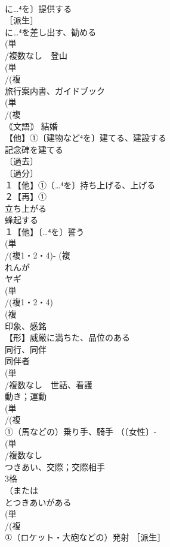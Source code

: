 \documentclass[8pt]{extreport}
\begin{document}
\begin{CJK}{UTF8}{min}
\\	に…⁴を〕提供する 
\\	［派生］ 
\\	に…⁴を差し出す、勧める
\\	(単
\\	/複数なし　登山 
\\	(単
\\	/(複
\\	旅行案内書、ガイドブック 
\\	(単
\\	/(複
\\	｟文語｠ 結婚 
\\	【他】①〔建物など⁴を〕建てる、建設する 
\\	記念碑を建てる
\\	〔過去〕
\\	〔過分〕
\\	１【他】①〔…⁴を〕持ち上げる、上げる 
\\	２【再】①
\\	立ち上がる 
\\	蜂起する
\\	１【他】〔…⁴を〕誓う 
\\	(単
\\	/(複1・2・4)- (複
\\	れんが 
\\	ヤギ 
\\	(単
\\	/(複1・2・4)
\\	(複
\\	印象、感銘 
\\	【形】威厳に満ちた、品位のある 
\\	同行、同伴　
\\	同伴者
\\	(単
\\	/複数なし　世話、看護 
\\	動き；運動 
\\	(単
\\	/(複
\\	①（馬などの）乗り手、騎手 （〔女性〕-
\\	(単
\\	/複数なし 
\\	つきあい、交際；交際相手 
\\	3格 
\\	（または
\\	とつきあいがある
\\	(単
\\	/(複
\\	①（ロケット・大砲などの）発射 ［派生］ 

\end{CJK}
\end{document}
